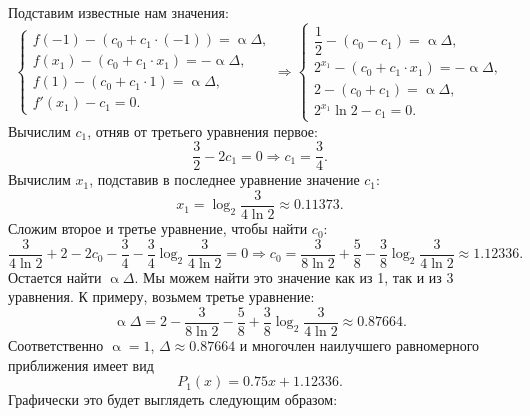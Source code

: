 \documentclass[a4paper, 12pt]{article}
\renewcommand{\alpha}{\upalpha}
\begin{document}
\begin{enumerate}
		Подставим известные нам значения: $$\begin{cases}
			f(-1) - (c_0 + c_1 \cdot (-1)) = \alpha\Delta,\\
			f(x_1) - (c_0 + c_1\cdot x_1) = -\alpha\Delta,\\
			f(1) - (c_0 + c_1 \cdot 1) = \alpha\Delta,\\
			f'(x_1) - c_1 = 0.
		\end{cases}\Rightarrow \begin{cases}
			\dfrac12 - (c_0 - c_1) = \alpha\Delta,\\
			2^{x_1} - (c_0 + c_1\cdot x_1) = -\alpha\Delta,\\
			2 - (c_0 + c_1) = \alpha\Delta,\\
			2^{x_1}\ln2 - c_1 = 0.
		\end{cases}$$
		Вычислим $c_1$, отняв от третьего уравнения первое:
		$$\dfrac{3}{2} - 2c_1 = 0 \Rightarrow c_1 = \dfrac34.$$
		Вычислим $x_1$, подставив в последнее уравнение значение $c_1$:
		$$x_1 = \log_2\dfrac{3}{4\ln 2}\approx 0.11373.$$
		Сложим второе и третье уравнение, чтобы найти $c_0$:
		$$\dfrac{3}{4\ln2} + 2 - 2c_0 - \dfrac34 -\dfrac34 \log_2\dfrac{3}{4\ln 2} = 0 \Rightarrow c_0 = \dfrac{3}{8\ln 2} + \dfrac58 - \dfrac{3}{8}\log_2\dfrac{3}{4\ln 2}\approx 1.12336.$$
		Остается найти $\alpha\Delta$. Мы можем найти это значение как из 1, так и из 3 уравнения. К примеру, возьмем третье уравнение:
		$$\alpha\Delta = 2 - \dfrac{3}{8\ln 2} - \dfrac58 + \dfrac{3}{8}\log_2\dfrac{3}{4\ln 2}\approx 0.87664.$$
		Соответственно $\alpha = 1$, $\Delta \approx 0.87664$ и многочлен наилучшего равномерного приближения имеет вид $$P_1(x) = 0.75x + 1.12336.$$ 
		Графически это будет выглядеть следующим образом:
		\begin{center}\end{center}
	

\end{enumerate}
\end{document}
